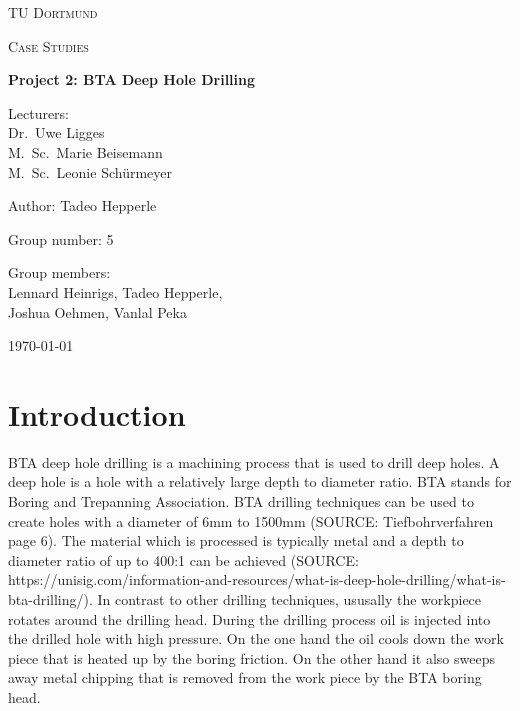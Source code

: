 \documentclass[12 pt]{scrartcl}
\begin{document}
\begin{titlepage}
  \centering
  {\scshape\LARGE TU Dortmund \par}
  \vspace{1cm}
  {\scshape\Large Case Studies \par}
  \vspace{2cm}
  {\huge\bfseries Project 2: BTA Deep Hole Drilling\par}
  \vspace{2cm}
  {\Large Lecturers:\\
    Dr.\ Uwe Ligges \\
    M.\ Sc.\ Marie Beisemann\\
    M.\ Sc.\ Leonie Schürmeyer \par}
  \vspace{1cm}
  {\Large Author: Tadeo Hepperle \par}
  \vspace{0.5 cm}
  {\Large Group number: 5\par}
  \vspace{0.5 cm}
  {\Large Group members: \\
    Lennard Heinrigs, Tadeo Hepperle, \\
    Joshua Oehmen, Vanlal Peka}
  \vfill
  {\large \today\par}
\end{titlepage}

\tableofcontents

\cleardoublepage

\section{Introduction}


BTA deep hole drilling is a machining process that is used to drill deep holes. A deep hole is a hole with a relatively large depth to diameter ratio.
BTA stands for Boring and Trepanning Association. BTA drilling techniques can be used to create holes with a diameter of 6mm to 1500mm (SOURCE: Tiefbohrverfahren page 6). The material which is processed is typically metal and a depth to diameter ratio of up to 400:1 can be achieved (SOURCE: https://unisig.com/information-and-resources/what-is-deep-hole-drilling/what-is-bta-drilling/). In contrast to other drilling techniques, ususally the workpiece rotates around the drilling head. During the drilling process oil is injected into the drilled hole with high pressure. On the one hand the oil cools down the work piece that is heated up by the boring friction. On the other hand it also sweeps away metal chipping that is removed from the work piece by the BTA boring head.
\end{document}

